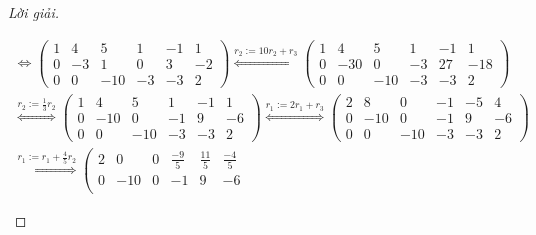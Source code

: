 \documentclass[class=nhvh-linear-algebra,crop=false]{standalone}
\begin{document}
\begin{proof}[Lời giải]
\begin{enumerate}[label = (\alph*)]
\begin{gather*}
{                  }{\Longleftrightarrow}
                  \left(\begin{array}{ccc|ccc}
                          1 & 4  & 5   & 1  & -1 & 1  \\
                          0 & -3 & 1   & 0  & 3  & -2 \\
                          0 & 0  & -10 & -3 & -3 & 2
                      \end{array}
                  \right)
                  \stackrel{
                      r_{2}:= 10r_{2} + r_{3}
                  }{\Longleftrightarrow}
                  \left(\begin{array}{ccc|ccc}
                          1 & 4   & 5   & 1  & -1 & 1   \\
                          0 & -30 & 0   & -3 & 27 & -18 \\
                          0 & 0   & -10 & -3 & -3 & 2
                      \end{array}
                  \right) \\
                  \stackrel{
                  r_{2}:= \frac{1}{3}r_{2}
                  }{\Longleftrightarrow}
                  \left(\begin{array}{ccc|ccc}
                          1 & 4   & 5   & 1  & -1 & 1  \\
                          0 & -10 & 0   & -1 & 9  & -6 \\
                          0 & 0   & -10 & -3 & -3 & 2
                      \end{array}
                  \right)
                  \stackrel{
                      r_{1}:= 2r_{1} + r_{3}
                  }{\Longleftrightarrow}
                  \left(\begin{array}{ccc|ccc}
                          2 & 8   & 0   & -1 & -5 & 4  \\
                          0 & -10 & 0   & -1 & 9  & -6 \\
                          0 & 0   & -10 & -3 & -3 & 2
                      \end{array}
                  \right) \\
                  \stackrel{
                  r_{1}:= r_{1} + \frac{4}{5}r_{2}
                  }{\Longleftrightarrow}
                  \left(\begin{array}{ccc|ccc}
                          2 & 0   & 0   & \frac{-9}{5} & \frac{11}{5} & \frac{-4}{5} \\
                          0 & -10 & 0   & -1           & 9            & -6           \\

\end{array}
\end{gather*}
\end{enumerate}
\end{proof}
\end{document}
